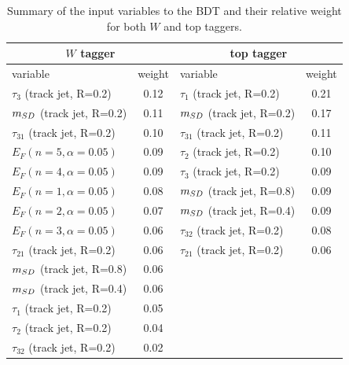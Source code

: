 \begin{table}[!htb]\centering
\begin{tabular}{| l | c | l | c |}
\hline
  \multicolumn{2}{|c|}{$W$ tagger}  & \multicolumn{2}{c|}{top tagger} \\
  \hline
 variable & weight & variable & weight \\
\hline
 $\tau_3$ (track jet, R=0.2)      & 0.12      & $\tau_1$ (track jet, R=0.2) & 0.21  \\
 $m_{SD}$  (track jet, R=0.2)      & 0.11      & $m_{SD}$  (track jet, R=0.2) & 0.17 \\
 $\tau_{31}$  (track jet, R=0.2) & 0.10     & $\tau_{31}$  (track jet, R=0.2)  & 0.11 \\
 $E_{F}(n=5,\alpha=0.05)$                               & 0.09     &  $\tau_2$ (track jet, R=0.2) & 0.10 \\
 $E_{F}(n=4,\alpha=0.05)$                               & 0.09     & $\tau_3$ (track jet, R=0.2) & 0.09 \\
 $E_{F}(n=1,\alpha=0.05)$                               & 0.08     & $m_{SD}$  (track jet, R=0.8)& 0.09 \\
 $E_{F}(n=2,\alpha=0.05)$                               & 0.07     &  $m_{SD}$  (track jet, R=0.4) & 0.09 \\
 $E_{F}(n=3,\alpha=0.05)$                               & 0.06     & $\tau_{32}$  (track jet, R=0.2) & 0.08 \\
 $\tau_{21}$  (track jet, R=0.2)& 0.06   & $\tau_{21}$  (track jet, R=0.2) & 0.06 \\
 $m_{SD}$  (track jet, R=0.8) & 0.06 &  &\\
 $m_{SD}$  (track jet, R=0.4) & 0.06 & & \\
 $\tau_1$ (track jet, R=0.2) & 0.05      &  &\\
 $\tau_2$ (track jet, R=0.2) & 0.04      &  &\\
 $\tau_{32}$  (track jet, R=0.2) & 0.02    &  &\\
\hline
\end{tabular}
\caption{Summary of the input variables to the BDT and their relative weight for both $W$ and top taggers. }
\label{tab:TMVA_summary}
\end{table}



